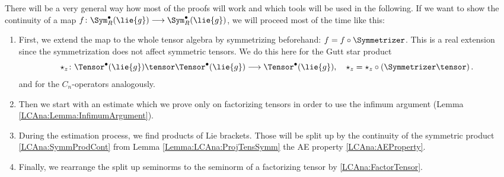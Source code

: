 There will be a very general way how most of the proofs will work and which 
tools will be used in the following. If we want to show the continuity of a 
map $f \colon \Sym_R^{\bullet}(\lie{g}) \longrightarrow 
\Sym_R^{\bullet}(\lie{g})$, we will proceed most of the time like this:
\begin{enumerate}
	\item \label{Item:LCAna:Step1}
	First, we extend the map to the whole tensor algebra by symmetrizing 
	beforehand: $f = f \circ \Symmetrizer$. This is a real extension since the 
	symmetrization does not affect symmetric tensors. We do this here for the 
	Gutt star product
	\begin{equation*}
		\ostar_z
		\colon
		\Tensor^{\bullet}(\lie{g})
		\tensor
		\Tensor^{\bullet}(\lie{g})
		\longrightarrow
		\Tensor^{\bullet}(\lie{g})
		, \quad
		\ostar_z 
		= 
		\star_z \circ 
		\left( \Symmetrizer \tensor \right).
	\end{equation*}
	and for the $C_n$-operators analogously.

	\item \label{Item:LCAna:Step2}
	Then we start with an estimate which we prove only on 
	factorizing tensors in order to use the infimum argument 
	(Lemma \ref{LCAna:Lemma:InfimumArgument}).

	\item \label{Item:LCAna:Step3}
	During the estimation process, we find products of Lie 
	brackets. Those will be split up by the continuity of the symmetric 
	product \eqref{LCAna:SymmProdCont} from Lemma 
	\ref{Lemma:LCAna:ProjTensSymm} the AE property \eqref{LCAna:AEProperty}.
	
	\item \label{Item:LCAna:Step4}
	Finally, we rearrange the split up seminorms to the seminorm of a 
	factorizing tensor by \eqref{LCAna:FactorTensor}.
\end{enumerate}



